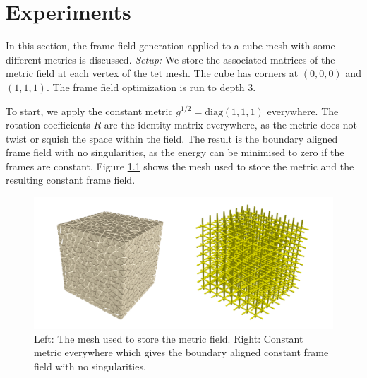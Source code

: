 \documentclass[../thesis.tex]{subfiles}
\begin{document}
\chapter{Experiments}
\label{ch:experiments}
In this section, the frame field generation applied to a cube mesh
with some different metrics is discussed.
\emph{Setup:} We store the associated matrices of the metric field at each vertex of the
tet mesh. The cube has corners at $(0,0,0)$ and $(1,1,1)$. The frame field optimization is run to depth 3.

To start, we apply the constant metric  $g^{1/2}=\mathrm{diag}(1,1,1)$
everywhere. The rotation coefficients $R$ are the identity matrix everywhere, as the metric does not twist or squish the space within the field.
The result is the boundary aligned frame field with no singularities, as the energy can be minimised to zero if the frames are constant. Figure \ref{fig:image1} shows the mesh used to store the metric
and the resulting constant frame field.
\begin{figure}[htb]
    \centering
    \includegraphics[width=\textwidth]{figures/image1}
    \caption{Left: The mesh used to store the metric field. Right: Constant metric everywhere which gives the boundary aligned constant frame field with no singularities.}
    \label{fig:image1}
\end{figure}
\end{document}
